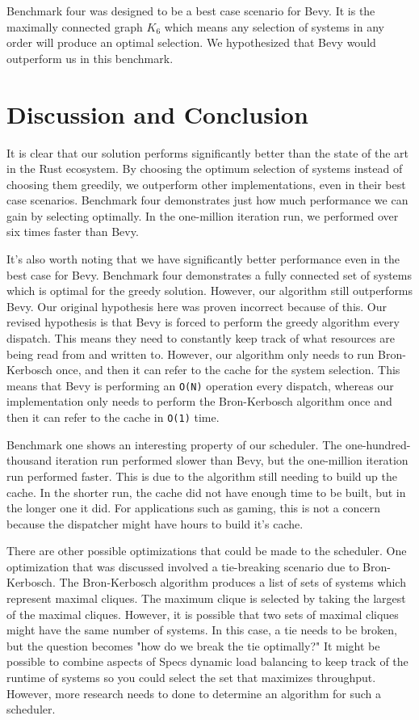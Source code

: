 \documentclass[conference]{IEEEtran}
\begin{document}
Benchmark four was designed to be a best case scenario for Bevy. It is the maximally connected graph $K_6$ which means any selection of systems in any order will produce an optimal selection. We hypothesized that Bevy would outperform us in this benchmark.

\section{Discussion and Conclusion}

It is clear that our solution performs significantly better than the state of the art in the Rust ecosystem. By choosing the optimum selection of systems instead of choosing them greedily, we outperform other implementations, even in their best case scenarios. Benchmark four demonstrates just how much performance we can gain by selecting optimally. In the one-million iteration run, we performed over six times faster than Bevy. 

It's also worth noting that we have significantly better performance even in the best case for Bevy. Benchmark four demonstrates a fully connected set of systems which is optimal for the greedy solution. However, our algorithm still outperforms Bevy. Our original hypothesis here was proven incorrect because of this. Our revised hypothesis is that Bevy is forced to perform the greedy algorithm every dispatch. This means they need to constantly keep track of what resources are being read from and written to. However, our algorithm only needs to run Bron-Kerbosch once, and then it can refer to the cache for the system selection. This means that Bevy is performing an \verb|O(N)| operation every dispatch, whereas our implementation only needs to perform the Bron-Kerbosch algorithm once and then it can refer to the cache in \verb|O(1)| time.

Benchmark one shows an interesting property of our scheduler. The one-hundred-thousand iteration run performed slower than Bevy, but the one-million iteration run performed faster. This is due to the algorithm still needing to build up the cache. In the shorter run, the cache did not have enough time to be built, but in the longer one it did. For applications such as gaming, this is not a concern because the dispatcher might have hours to build it's cache.

There are other possible optimizations that could be made to the scheduler. One optimization that was discussed involved a tie-breaking scenario due to Bron-Kerbosch. The Bron-Kerbosch algorithm produces a list of sets of systems which represent maximal cliques. The maximum clique is selected by taking the largest of the maximal cliques. However, it is possible that two sets of maximal cliques might have the same number of systems. In this case, a tie needs to be broken, but the question becomes "how do we break the tie optimally?" It might be possible to combine aspects of Specs dynamic load balancing to keep track of the runtime of systems so you could select the set that maximizes throughput. However, more research needs to done to determine an algorithm for such a scheduler.
\end{document}
